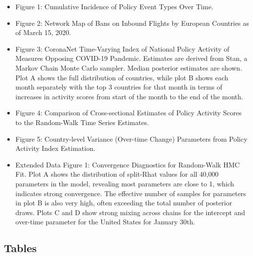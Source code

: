 \documentclass[]{article}
\begin{document}
\begin{itemize}
\item
  Figure 1: Cumulative Incidence of Policy Event Types Over Time.
\item
  Figure 2: Network Map of Bans on Inbound Flights by European Countries as of March 15, 2020.
\item
  Figure 3: CoronaNet Time-Varying Index of National Policy Activity of Measures Opposing COVID-19 Pandemic. Estimates are derived from Stan, a Markov Chain Monte Carlo sampler. Median posterior estimates are shown. Plot A shows the full distribution of countries, while plot B shows each month separately with the top 3 countries for that month in terms of increases in activity scores from start of the month to the end of the month.
\item
  Figure 4: Comparison of Cross-sectional Estimates of Policy Activity Scores to the Random-Walk Time Series Estimates.
\item
  Figure 5: Country-level Variance (Over-time Change) Parameters from Policy Activity Index Estimation.
\item
  Extended Data Figure 1: Convergence Diagnostics for Random-Walk HMC Fit. Plot A shows the distribution of split-Rhat values for all 40,000 parameters in the model, revealing most parameters are close to 1, which indicates strong convergence. The effective number of samples for parameters in plot B is also very high, often exceeding the total number of posterior draws. Plots C and D show strong mixing across chains for the intercept and over-time parameter for the United States for January 30th.
\end{itemize}

\hypertarget{tables}{%
\subsection*{Tables}\label{tables}}
\end{document}
